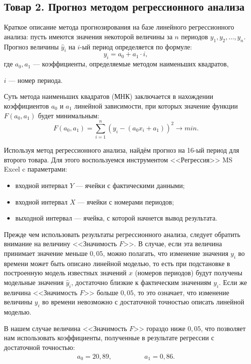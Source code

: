 \subsection{Товар 2. Прогноз методом регрессионного анализа}

Краткое описание метода прогнозирования на базе линейного регрессионного анализа:
пусть имеются значения некоторой величины за $n$ периодов $y_1, y_2, \dots, y_n$.
Прогноз величины $\hat{y}_{i}$ на $i$-ый период определяется по формуле:
\[
  y_{i} = a_0 + a_1 \cdot i,
\]
где \hspace{2mm} $a_0, a_1$ --- коэффициенты, определяемые методом наименьших квадратов, \par
                 $i$ --- номер периода.

Суть метода наименьших квадратов (МНК) заключается в нахождении
коэффициентов $a_0$ и $a_1$ линейной зависимости, при которых
значение функции $F(a_0, a_1)$ будет минимальным:
\[
  F(a_0, a_1) = \sum_{i=1}^{n} (y_i - (a_0 x_i + a_1))^2 \rightarrow min.
\]

Используя метод регрессионного анализа, найдём прогноз на 16-ый период
для второго товара. Для этого воспользуемся инструментом
<<Регрессия>> MS Excel c параметрами:
\begin{itemize}
  \item входной интервал $Y$ --- ячейки с фактическими данными;
  \item входной интервал $X$ --- ячейки с номерами периодов;
  \item выходной интервал --- ячейка, с которой начнется вывод результата.
\end{itemize}

Прежде чем использовать результаты регрессионного анализа,
следует обратить внимание на величину <<Значимость $F$>>. В случае, если
эта величина принимает значение меньше $0{,}05$, можно полагать, что
изменение значения $y_i$ во времени может быть описано линейной моделью, то
есть при подстановке в построенную модель известных значений $x$ (номеров периодов)
будут получены модельные значения $\hat{y}_i$, достаточно близкие к фактическим
значениям $y_i$. Если же величина <<Значимость $F$>> больше $0{,}05$, то
это означает, что изменение величины $y_i$ во времени невозможно с достаточной
точностью описать линейной моделью.

В нашем случае величина <<Значимость $F$>> гораздо ниже $0,05$, что позволяет
нам использовать коэффициенты, полученные в результате регрессии с достаточной точностью:
\begin{align*}
  a_0 = 20{,}89, \hspace{2cm} a_1 = 0{,}86.
\end{align*}


